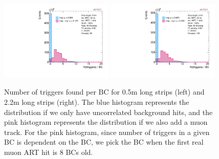 \begin{figure}[!htpb]
  \begin{center}
    \includegraphics[width=0.48\textwidth]{figures/r96_ntrig_BC7.pdf}
    \includegraphics[width=0.48\textwidth]{figures/r136_ntrig_BC7.pdf}
  \end{center}
  \vspace{-10pt}
  \caption{Number of triggers found per BC for 0.5m long strips (left) and 2.2m long strips (right). The blue histogram represents the distribution if we only have uncorrelated background hits, and the pink histogram represents the distribution if we also add a muon track. For the pink histogram, since number of triggers in a given BC is dependent on the BC, we pick the BC when the first real muon ART hit is 8 BCs old.}
  \label{fig:ntrig}
\end{figure}
